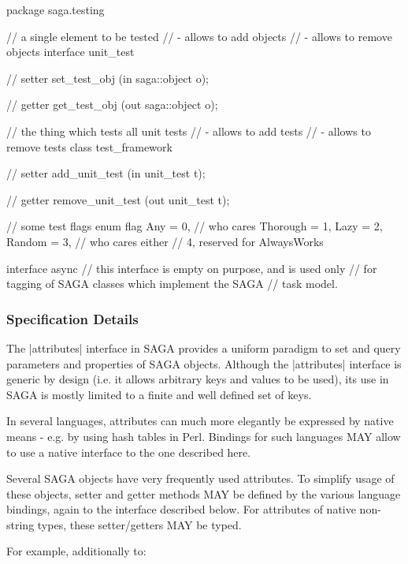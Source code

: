  \begin{myspec}
  package saga.testing
  {
    // a single element to be tested
    //    - allows to add objects
    //    - allows to remove objects
    interface unit_test
    {
      // setter
      set_test_obj            (in  saga::object o);

      // getter
      get_test_obj            (out saga::object o);
    }

    // the thing which tests all unit tests
    //    - allows to add tests
    //    - allows to remove tests
    class test_framework
    {
      // setter
      add_unit_test           (in  unit_test    t);

      // getter
      remove_unit_test        (out unit_test    t);
    }

    // some test flags
    enum flag
    {
      Any      = 0,  // who cares
      Thorough = 1,
      Lazy     = 2,
      Random   = 3,  // who cares either 
   //            4, reserved for AlwaysWorks
    }

    interface async
    {
      // this interface is empty on purpose, and is used only
      // for tagging of SAGA classes which implement the SAGA
      // task model.
    }
  }
 \end{myspec}
 
 \subsubsection{Specification Details}
 
  The |attributes| interface in SAGA provides a uniform paradigm
  to set and query parameters and properties of SAGA objects.
  Although the |attributes| interface is generic by design (i.e.
  it allows arbitrary keys and values to be used), its use in
  SAGA is mostly limited to a finite and well defined set of
  keys.
 
  In several languages, attributes can much more elegantly
  be expressed by native means - e.g. by using hash
  tables in Perl.  Bindings for such languages MAY allow to use
  a native interface  to the one described here.
 
  Several SAGA objects have very frequently used attributes.  To
  simplify usage of these objects, setter and getter methods MAY
  be defined by the various language bindings, again
   to the interface described below.  For
  attributes of native non-string types, these setter/getters
  MAY be typed.
 
  For example, additionally to:
 
